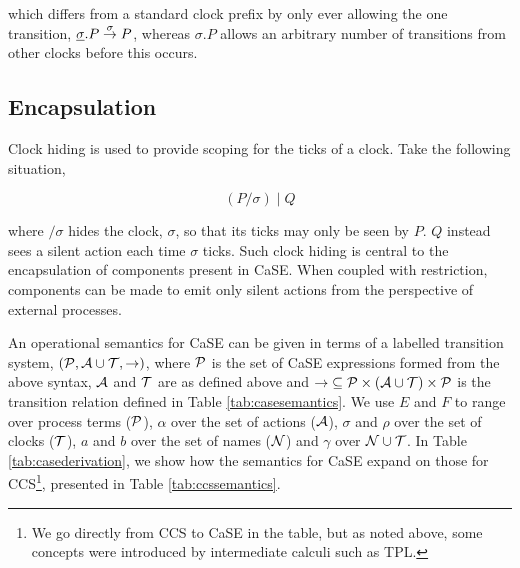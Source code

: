 \noindent which differs from a standard clock prefix by only ever
allowing the one transition, $\underline{\sigma}.P \stackrel{\sigma}{\rightarrow}
P$, whereas $\sigma.P$ allows an arbitrary number of transitions from
other clocks before this occurs.

\subsection{Encapsulation}

Clock hiding is used to provide scoping for the ticks of a
clock.  Take the following situation,

\begin{equation}
\label{clockhidingex}
  (P / \sigma)\;|\;Q
\end{equation}

\noindent where $/ \sigma$ hides the clock, $\sigma$, so that its
ticks may only be seen by $P$.  $Q$ instead sees a silent action each
time $\sigma$ ticks.  Such clock hiding is central to the
encapsulation of components present in CaSE.  When coupled with
restriction, components can be made to emit only silent actions from
the perspective of external processes.

An operational semantics for CaSE can be given in terms of a labelled
transition system, $(\text{$\mathcal{P}$}, \text{$\mathcal{A}$} \cup \text{$\mathcal{T}$}, \rightarrow)$,
where $\text{$\mathcal{P}$}$ is the set of CaSE expressions formed from the above
syntax, $\text{$\mathcal{A}$}$ and $\text{$\mathcal{T}$}$ are as defined above and
$\mathop{\rightarrow} \mathrel{\subseteq} \text{$\mathcal{P}$} \times (\text{$\mathcal{A}$} \cup
\text{$\mathcal{T}$}) \times \text{$\mathcal{P}$}$ is the transition relation defined in Table
\ref{tab:casesemantics}.  We use $E$ and $F$ to range over process
terms ($\text{$\mathcal{P}$}$), $\alpha$ over the set of actions ($\text{$\mathcal{A}$}$),
$\sigma$ and $\rho$ over the set of clocks ($\text{$\mathcal{T}$}$), $a$ and $b$
over the set of names ($\text{$\mathcal{N}$}$) and $\gamma$ over $\text{$\mathcal{N}$} \cup
\text{$\mathcal{T}$}$. In Table \ref{tab:casederivation}, we show how the semantics
for CaSE expand on those for CCS\footnote{We go directly from CCS to
  CaSE in the table, but as noted above, some concepts were
  introduced by intermediate calculi such as TPL.}, presented in Table
\ref{tab:ccssemantics}.


